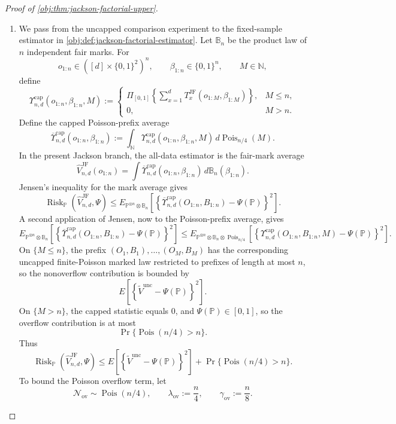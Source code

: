 \begin{proof}[Proof of \cref{obj:thm:jackson-factorial-upper}]
\begin{enumerate}
\item We pass from the uncapped comparison experiment to the fixed-sample
estimator in \cref{obj:def:jackson-factorial-estimator}.  Let
\(\mathbb B_n\) be the product law of \(n\) independent fair marks.  For
\[
o_{1:n}\in([d]\times\{0,1\}^2)^n,
\qquad
\beta_{1:n}\in\{0,1\}^n,
\qquad
M\in\mathbb N,
\]
define
\[
\Upsilon_{n,d}^{\mathrm{cap}}(o_{1:n},\beta_{1:n},M)
:=
\begin{cases}
\Pi_{[0,1]}\!\left\{
\sum_{x=1}^d
T_x^{\mathrm{JF}}(o_{1:M},\beta_{1:M})
\right\},
& M\le n,\\[0.4em]
0, & M>n .
\end{cases}
\]
Define the capped Poisson-prefix average
\[
\overline\Upsilon_{n,d}^{\mathrm{cap}}(o_{1:n},\beta_{1:n})
:=
\int_{\mathbb N}
\Upsilon_{n,d}^{\mathrm{cap}}(o_{1:n},\beta_{1:n},M)\,
d\operatorname{Pois}_{n/4}(M).
\]
In the present Jackson branch, the all-data estimator is the fair-mark average
\[
\widehat V_{n,d}^{\mathrm{JF}}(o_{1:n})
=
\int
\overline\Upsilon_{n,d}^{\mathrm{cap}}(o_{1:n},\beta_{1:n})\,
d\mathbb B_n(\beta_{1:n}).
\]
Jensen's inequality for the mark average gives
\[
\operatorname{Risk}_{\mathbb P}
(\widehat V_{n,d}^{\mathrm{JF}},\Psi)
\le
E_{\mathbb P^{\otimes n}\otimes\mathbb B_n}
\left[
\left\{
\overline\Upsilon_{n,d}^{\mathrm{cap}}(O_{1:n},B_{1:n})
-\Psi(\mathbb P)
\right\}^2
\right].
\]
A second application of Jensen, now to the Poisson-prefix average, gives
\[
E_{\mathbb P^{\otimes n}\otimes\mathbb B_n}
\left[
\left\{
\overline\Upsilon_{n,d}^{\mathrm{cap}}(O_{1:n},B_{1:n})
-\Psi(\mathbb P)
\right\}^2
\right]
\le
E_{\mathbb P^{\otimes n}\otimes\mathbb B_n\otimes\operatorname{Pois}_{n/4}}
\left[
\left\{
\Upsilon_{n,d}^{\mathrm{cap}}(O_{1:n},B_{1:n},M)-\Psi(\mathbb P)
\right\}^2
\right].
\]
On \(\{M\le n\}\), the prefix
\((O_1,B_1),\ldots,(O_M,B_M)\) has the corresponding uncapped
finite-Poisson marked law restricted to prefixes of length at most \(n\), so
the nonoverflow contribution is bounded by
\[
E\left[
\left\{\widetilde V^{\mathrm{unc}}-\Psi(\mathbb P)\right\}^2
\right].
\]
On \(\{M>n\}\), the capped statistic equals \(0\), and
\(\Psi(\mathbb P)\in[0,1]\), so the overflow contribution is at most
\[
\Pr\{\operatorname{Pois}(n/4)>n\}.
\]
Thus
\[
\operatorname{Risk}_{\mathbb P}
(\widehat V_{n,d}^{\mathrm{JF}},\Psi)
\le
E\left[
\left\{\widetilde V^{\mathrm{unc}}-\Psi(\mathbb P)\right\}^2
\right]
+
\Pr\{\operatorname{Pois}(n/4)>n\}.
\]
To bound the Poisson overflow term, let
\[
\mathcal N_{\mathrm{ov}}\sim\operatorname{Pois}(n/4),
\qquad
\lambda_{\mathrm{ov}}:=\frac n4,
\qquad
\gamma_{\mathrm{ov}}:=\frac n8 .
\]
\end{enumerate}
\end{proof}
